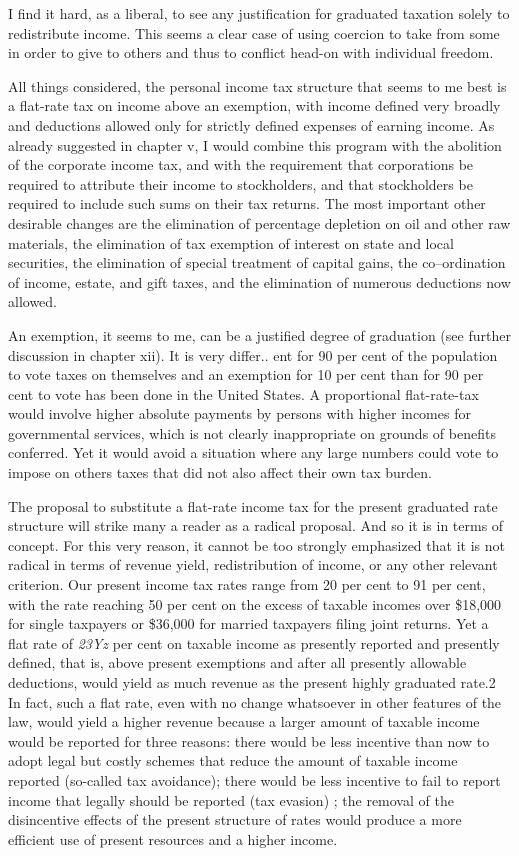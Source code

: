 \documentclass[11pt,openany]{book}
\begin{document}
I find it hard, as a liberal, to see any justification for graduated taxation solely to redistribute income. This seems a clear case of using coercion to take from some in order to give to others and thus to conflict head-on with individual freedom.

All things considered, the personal income tax structure that seems to me best is a flat-rate tax on income above an exemption, with income defined very broadly and deductions allowed only for strictly defined expenses of earning income. As already suggested in chapter v, I would combine this program with the abolition of the corporate income tax, and with the requirement that corporations be required to attribute their income to stockholders, and that stockholders be required to include such sums on their tax returns. The most important other desirable changes are the elimination of percentage depletion on oil and other raw materials, the elimination of tax exemption of interest on state and local securities, the elimination of special treatment of capital gains, the co--ordination of income, estate, and gift taxes, and the elimination of numerous deductions now allowed.

An exemption, it seems to me, can be a justified degree of graduation (see further discussion in chapter xii). It is very differ.. ent for 90 per cent of the population to vote taxes on themselves and an exemption for 10 per cent than for 90 per cent to vote has been done in the United States. A proportional flat-rate-tax would involve higher absolute payments by persons with higher incomes for governmental services, which is not clearly inappropriate on grounds of benefits conferred. Yet it would avoid a situation where any large numbers could vote to impose on others taxes that did not also affect their own tax burden.

The proposal to substitute a flat-rate income tax for the present graduated rate structure will strike many a reader as a radical proposal. And so it is in terms of concept. For this very reason, it cannot be too strongly emphasized that it is not radical in terms of revenue yield, redistribution of income, or any other relevant criterion. Our present income tax rates range from 20 per cent to 91 per cent, with the rate reaching 50 per cent on the excess of taxable incomes over \$18,000 for single taxpayers or \$36,000 for married taxpayers filing joint returns. Yet a flat rate of \emph{23Yz} per cent on taxable income as presently reported and presently defined, that is, above present exemptions and after all presently allowable deductions, would yield as much revenue as the present highly graduated rate.2 In fact, such a flat rate, even with no change whatsoever in other features of the law, would yield a higher revenue because a larger amount of taxable income would be reported for three reasons: there would be less incentive than now to adopt legal but costly schemes that reduce the amount of taxable income reported (so-called tax avoidance); there would be less incentive to fail to report income that legally should be reported (tax evasion) ; the removal of the disincentive effects of the present structure of rates would produce a more efficient use of present resources and a higher income.
\end{document}
